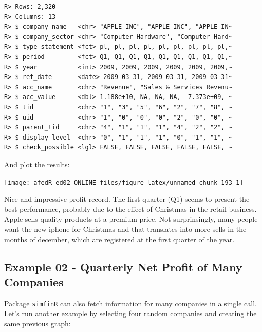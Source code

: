 \documentclass[
  12pt,
]{book}
\begin{document}
\begin{verbatim}
R> Rows: 2,320
R> Columns: 13
R> $ company_name   <chr> "APPLE INC", "APPLE INC", "APPLE IN~
R> $ company_sector <chr> "Computer Hardware", "Computer Hard~
R> $ type_statement <fct> pl, pl, pl, pl, pl, pl, pl, pl, pl,~
R> $ period         <fct> Q1, Q1, Q1, Q1, Q1, Q1, Q1, Q1, Q1,~
R> $ year           <int> 2009, 2009, 2009, 2009, 2009, 2009,~
R> $ ref_date       <date> 2009-03-31, 2009-03-31, 2009-03-31~
R> $ acc_name       <chr> "Revenue", "Sales & Services Revenu~
R> $ acc_value      <dbl> 1.188e+10, NA, NA, NA, -7.373e+09, ~
R> $ tid            <chr> "1", "3", "5", "6", "2", "7", "8", ~
R> $ uid            <chr> "1", "0", "0", "0", "2", "0", "0", ~
R> $ parent_tid     <chr> "4", "1", "1", "1", "4", "2", "2", ~
R> $ display_level  <chr> "0", "1", "1", "1", "0", "1", "1", ~
R> $ check_possible <lgl> FALSE, FALSE, FALSE, FALSE, FALSE, ~
\end{verbatim}

And plot the results:

\begin{center}\texttt{[image: afedR\_ed02-ONLINE\_files/figure-latex/unnamed-chunk-193-1]} \end{center}

Nice and impressive profit record. The first quarter (Q1) seems to present the best performance, probably due to the effect of Christmas in the retail business. Apple sells quality products at a premium price. Not surprinsingly, many people want the new iphone for Christmas and that translates into more sells in the months of december, which are registered at the first quarter of the year.

\hypertarget{example-02---quarterly-net-profit-of-many-companies}{%
\subsection{Example 02 - Quarterly Net Profit of Many Companies}\label{example-02---quarterly-net-profit-of-many-companies}}

Package \texttt{simfinR} can also fetch information for many companies in a single call. Let's run another example by selecting four random companies and creating the same previous graph:
\end{document}
